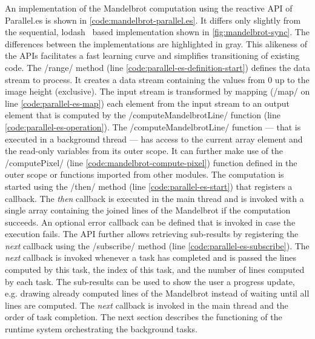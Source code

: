  An implementation of the Mandelbrot computation using the reactive API of Parallel.es is shown in \cref{code:mandelbrot-parallel.es}. It differs only slightly from the sequential, lodash~\cite{lodash} based implementation shown in \cref{fig:mandelbrot-sync}. The differences between the implementations are highlighted in gray. This alikeness of the APIs facilitates a fast learning curve and simplifies transitioning of existing code. The \javascriptinline/range/ method (line \ref{code:parallel-es-definition-start}) defines the data stream to process. It creates a data stream containing the values from 0 up to the image height (exclusive). The input stream is transformed by mapping (\javascriptinline/map/ on line \ref{code:parallel-es-map}) each element from the input stream to an output element that is computed by the \javascriptinline/computeMandelbrotLine/ function (line \ref{code:parallel-es-operation}). The \javascriptinline/computeMandelbrotLine/ function --- that is executed in a background thread --- has access to the current array element and the read-only variables from its outer scope. It can further make use of the \javascriptinline/computePixel/ (line \ref{code:mandelbrot-compute-pixel}) function defined in the outer scope or functions imported from other modules. The computation is started using the \javascriptinline/then/ method (line \ref{code:parallel-es-start}) that registers a callback. The \textit{then} callback is executed in the main thread and is invoked with a single array containing the joined lines of the Mandelbrot if the computation succeeds. An optional error callback can be defined that is invoked in case the execution fails. The API further allows retrieving sub-results by registering the \textit{next} callback using the \javascriptinline/subscribe/ method (line \ref{code:parallel-es-subscribe}). The \textit{next} callback is invoked whenever a task has completed and is passed the lines computed by this task, the index of this task, and the number of lines computed by each task. The sub-results can be used to show the user a progress update, e.g. drawing already computed lines of the Mandelbrot instead of waiting until all lines are computed. The \textit{next} callback is invoked in  the main thread and the order of task completion. The next section describes the functioning of the runtime system orchestrating the background tasks.
 
